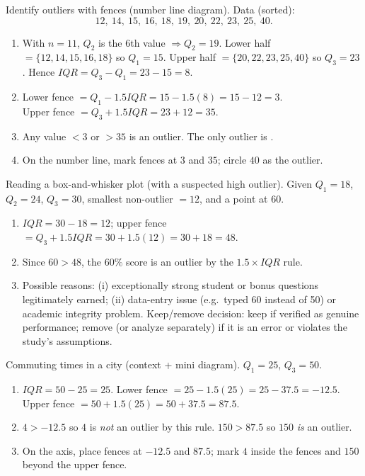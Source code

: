 \documentclass[11pt]{article}
\def\textbf#1{#1}%
\def\mathrm#1{#1}%
\newcounter{question}
\begin{document}

\begin{solution}
\textbf{Identify outliers with fences (number line diagram).}
Data (sorted):
\[
12,\ 14,\ 15,\ 16,\ 18,\ 19,\ 20,\ 22,\ 23,\ 25,\ 40.
\]
\begin{enumerate}
  \item With $n=11$, $Q_2$ is the 6th value $\Rightarrow Q_2=19$.  
  Lower half $=\{12,14,15,16,18\}$ so $Q_1=15$.  
  Upper half $=\{20,22,23,25,40\}$ so $Q_3=23$.  
  Hence $\mathrm{IQR}=Q_3-Q_1=23-15=8$.
  \item Lower fence $=Q_1-1.5\mathrm{IQR}=15-1.5(8)=15-12=3$.\\
  Upper fence $=Q_3+1.5\mathrm{IQR}=23+12=35$.
  \item Any value $<3$ or $>35$ is an outlier. The only outlier is .
  \item On the number line, mark fences at $3$ and $35$; circle $40$ as the outlier.
\end{enumerate}
\end{solution}


\begin{solution}
\textbf{Reading a box-and-whisker plot (with a suspected high outlier).}
Given $Q_1=18$, $Q_2=24$, $Q_3=30$, smallest non-outlier $=12$, and a point at $60$.
\begin{enumerate}
  \item $\mathrm{IQR}=30-18=12$; upper fence $=Q_3+1.5\mathrm{IQR}=30+1.5(12)=30+18=48$.
  \item Since $60>48$, the $60\%$ score is \textbf{an outlier} by the $1.5\times\mathrm{IQR}$ rule.
  \item Possible reasons: (i) exceptionally strong student or bonus questions legitimately earned; (ii) data-entry issue (e.g.\ typed 60 instead of 50) or academic integrity problem.  
  Keep/remove decision: keep if verified as genuine performance; remove (or analyze separately) if it is an error or violates the study’s assumptions.
\end{enumerate}
\end{solution}


\begin{solution}
\textbf{Commuting times in a city (context + mini diagram).}
$Q_1=25$, $Q_3=50$.
\begin{enumerate}
  \item $\mathrm{IQR}=50-25=25$.  
  Lower fence $=25-1.5(25)=25-37.5=-12.5$.  
  Upper fence $=50+1.5(25)=50+37.5=87.5$.
  \item $4>-12.5$ so $4$ is \emph{not} an outlier by this rule.  
        $150>87.5$ so $150$ \emph{is} an outlier.
  \item On the axis, place fences at $-12.5$ and $87.5$; mark $4$ inside the fences and $150$ beyond the upper fence.
\end{enumerate}
\end{solution}
\end{document}
